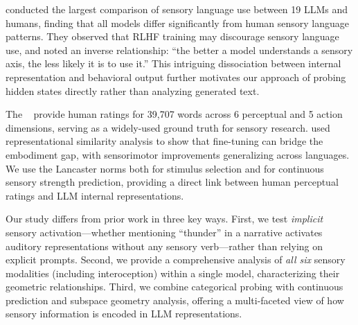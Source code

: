 \citet{hicke2025zero} conducted the largest comparison of sensory language use between 19 LLMs and humans, finding that all models differ significantly from human sensory language patterns. They observed that RLHF training may discourage sensory language use, and noted an inverse relationship: ``the better a model understands a sensory axis, the less likely it is to use it.'' This intriguing dissociation between internal representation and behavioral output further motivates our approach of probing hidden states directly rather than analyzing generated text.

The \lancaster~\citep{lynott2020lancaster} provide human ratings for 39,707 words across 6 perceptual and 5 action dimensions, serving as a widely-used ground truth for sensory research. \citet{wu2026finetune} used representational similarity analysis to show that fine-tuning can bridge the embodiment gap, with sensorimotor improvements generalizing across languages. We use the Lancaster norms both for stimulus selection and for continuous sensory strength prediction, providing a direct link between human perceptual ratings and LLM internal representations.

Our study differs from prior work in three key ways. First, we test \emph{implicit} sensory activation---whether mentioning ``thunder'' in a narrative activates auditory representations without any sensory verb---rather than relying on explicit prompts. Second, we provide a comprehensive analysis of \emph{all six} sensory modalities (including interoception) within a single model, characterizing their geometric relationships. Third, we combine categorical probing with continuous prediction and subspace geometry analysis, offering a multi-faceted view of how sensory information is encoded in LLM representations.
